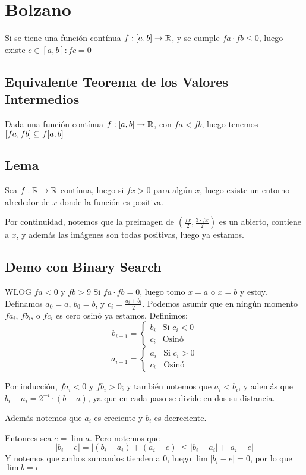 \documentclass{article}
\begin{document}
	\section{Bolzano}
	Si se tiene una función contínua $f : [a, b] \to \mathbb{R}$, y se cumple $fa \cdot
	fb \leq 0$, luego existe $c \in [a, b] : fc = 0$

	\subsection{Equivalente Teorema de los Valores Intermedios}
	Dada una función contínua $f : [a, b] \to \mathbb{R}$, con $fa < fb$, luego tenemos
	$[fa, fb] \subseteq f [a, b]$

	\subsection{Lema}
	Sea $f : \mathbb{R} \to \mathbb{R}$ contínua, luego si $fx > 0$ para algún $x$, luego existe
	un entorno alrededor de $x$ donde la función es positiva.

	Por continuidad, notemos que la preimagen de $\left(\frac{fx}{2}, \frac{3 \cdot
	fx}{2}\right)$ es un abierto, contiene a $x$, y además las imágenes son
	todas positivas, luego ya estamos.

	\subsection{Demo con Binary Search}
	WLOG $fa < 0$ y $fb > 9$
	Si $fa \cdot fb = 0$, luego tomo $x = a$ o $x = b$ y estoy.
	Definamos $a_0 = a$, $b_0 = b$, y $c_i = \frac{a_i + b_i}{2}$.
	Podemos asumir que en ningún momento $fa_i$, $fb_i$, o $fc_i$ es
	cero osinó ya estamos. Definimos:
	\[b_{i+1} = 
		\begin{cases}
			b_i & \text{Si $c_i < 0$} \\
			c_i & \text{Osinó}
		\end{cases}
	\]\[
	a_{i+1} = 
		\begin{cases}
			a_i & \text{Si $c_i > 0$} \\
			c_i & \text{Osinó}
		\end{cases}
	\]

	Por inducción, $fa_i < 0$ y $fb_i > 0$; y también
	notemos que $a_i < b_i$, y además que $b_i - a_i = 2^{-i}
	\cdot (b - a)$, ya que en cada paso se divide en dos su distancia.

	Además notemos que $a_i$ es creciente y $b_i$ es decreciente.

	Entonces sea $e = \lim a$. Pero notemos que \[|b_i - e| = |(b_i - a_i) +
	(a_i - e)| \leq |b_i - a_i| + |a_i - e|\] Y notemos que ambos sumandos
	tienden a $0$, luego $\lim |b_i - e| = 0$, por lo que $\lim b = e$
\end{document}
